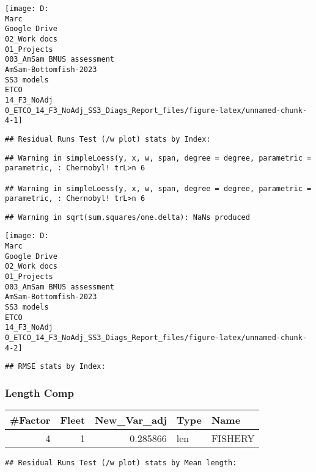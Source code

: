 \documentclass[
]{article}
\begin{document}
\begin{center}\texttt{[image: D:\\Marc\\Google Drive\\02\_Work docs\\01\_Projects\\003\_AmSam BMUS assessment\\AmSam-Bottomfish-2023\\SS3 models\\ETCO\\14\_F3\_NoAdj\\0\_ETCO\_14\_F3\_NoAdj\_SS3\_Diags\_Report\_files/figure-latex/unnamed-chunk-4-1]} \end{center}

\begin{verbatim}
## Residual Runs Test (/w plot) stats by Index:
\end{verbatim}

\begin{verbatim}
## Warning in simpleLoess(y, x, w, span, degree = degree, parametric = parametric, : Chernobyl! trL>n 6

## Warning in simpleLoess(y, x, w, span, degree = degree, parametric = parametric, : Chernobyl! trL>n 6
\end{verbatim}

\begin{verbatim}
## Warning in sqrt(sum.squares/one.delta): NaNs produced
\end{verbatim}

\begin{center}\texttt{[image: D:\\Marc\\Google Drive\\02\_Work docs\\01\_Projects\\003\_AmSam BMUS assessment\\AmSam-Bottomfish-2023\\SS3 models\\ETCO\\14\_F3\_NoAdj\\0\_ETCO\_14\_F3\_NoAdj\_SS3\_Diags\_Report\_files/figure-latex/unnamed-chunk-4-2]} \end{center}

\begin{verbatim}
## RMSE stats by Index:
\end{verbatim}

\hypertarget{length-comp}{%
\subsubsection{Length Comp}\label{length-comp}}

\captionsetup[table]{labelformat=empty,skip=1pt}
\begin{longtable}{rrrll}
\toprule
\#Factor & Fleet & New\_Var\_adj & Type & Name \\ 
\midrule
4 & 1 & 0.285866 & len & FISHERY \\ 
\bottomrule
\end{longtable}

\begin{verbatim}
## Residual Runs Test (/w plot) stats by Mean length:
\end{verbatim}
\end{document}
